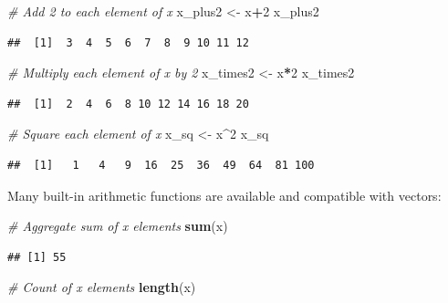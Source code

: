 \documentclass[]{book}
\newenvironment{Shaded}{\begin{snugshade}}{\end{snugshade}}
\newcommand{\CommentTok}[1]{\textcolor[rgb]{0.56,0.35,0.01}{\textit{#1}}}
\newcommand{\DecValTok}[1]{\textcolor[rgb]{0.00,0.00,0.81}{#1}}
\newcommand{\KeywordTok}[1]{\textcolor[rgb]{0.13,0.29,0.53}{\textbf{#1}}}
\newcommand{\NormalTok}[1]{#1}
\newcommand{\OperatorTok}[1]{\textcolor[rgb]{0.81,0.36,0.00}{\textbf{#1}}}
\newcommand{\StringTok}[1]{\textcolor[rgb]{0.31,0.60,0.02}{#1}}
\begin{document}
\begin{Shaded}
\begin{Highlighting}[]
\CommentTok{# Add 2 to each element of x}
\NormalTok{x_plus2 <-}\StringTok{ }\NormalTok{x}\OperatorTok{+}\DecValTok{2}
\NormalTok{x_plus2}
\end{Highlighting}
\end{Shaded}

\begin{verbatim}
##  [1]  3  4  5  6  7  8  9 10 11 12
\end{verbatim}

\begin{Shaded}
\begin{Highlighting}[]
\CommentTok{# Multiply each element of x by 2}
\NormalTok{x_times2 <-}\StringTok{ }\NormalTok{x}\OperatorTok{*}\DecValTok{2}
\NormalTok{x_times2}
\end{Highlighting}
\end{Shaded}

\begin{verbatim}
##  [1]  2  4  6  8 10 12 14 16 18 20
\end{verbatim}

\begin{Shaded}
\begin{Highlighting}[]
\CommentTok{# Square each element of x}
\NormalTok{x_sq <-}\StringTok{ }\NormalTok{x}\OperatorTok{^}\DecValTok{2}
\NormalTok{x_sq}
\end{Highlighting}
\end{Shaded}

\begin{verbatim}
##  [1]   1   4   9  16  25  36  49  64  81 100
\end{verbatim}

Many built-in arithmetic functions are available and compatible with vectors:

\begin{Shaded}
\begin{Highlighting}[]
\CommentTok{# Aggregate sum of x elements}
\KeywordTok{sum}\NormalTok{(x)}
\end{Highlighting}
\end{Shaded}

\begin{verbatim}
## [1] 55
\end{verbatim}

\begin{Shaded}
\begin{Highlighting}[]
\CommentTok{# Count of x elements}
\KeywordTok{length}\NormalTok{(x)}
\end{Highlighting}
\end{Shaded}
\end{document}
